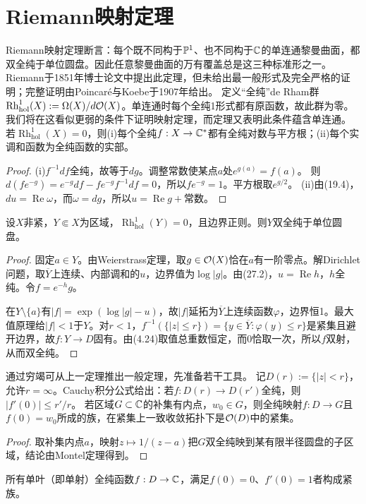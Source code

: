 \section{Riemann映射定理}
Riemann映射定理断言：每个既不同构于$\mathbb P^1$、也不同构于$\mathbb C$的单连通黎曼曲面，都双全纯于单位圆盘。因此任意黎曼曲面的万有覆盖总是这三种标准形之一。Riemann于1851年博士论文中提出此定理，但未给出最一般形式及完全严格的证明；完整证明由Poincaré与Koebe于1907年给出。
定义“全纯”de Rham群$\operatorname{Rh}_{\mathrm{hol}}^1(X):=\Omega(X)/d\mathcal O(X)$。单连通时每个全纯1形式都有原函数，故此群为零。我们将在这看似更弱的条件下证明映射定理，而定理又表明此条件蕴含单连通。
若$\operatorname{Rh}_{\mathrm{hol}}^1(X)=0$，则(i)每个全纯$f:X\to\mathbb C^*$都有全纯对数与平方根；(ii)每个实调和函数为全纯函数的实部。
\begin{proof}
(i)$f^{-1}df$全纯，故等于$dg$。调整常数使某点$a$处$e^{g(a)}=f(a)$。
则$d(fe^{-g})=e^{-g}df-fe^{-g}f^{-1}df=0$，所以$fe^{-g}=1$。平方根取$e^{g/2}$。
(ii)由(19.4)，$du=\operatorname{Re}\omega$，而$\omega=dg$，所以$u=\operatorname{Re}g+\text{常数}$。
\end{proof}
设$X$非紧，$Y\Subset X$为区域，$\operatorname{Rh}_{\mathrm{hol}}^1(Y)=0$，且边界正则。则$Y$双全纯于单位圆盘。
\begin{proof}
固定$a\in Y$。由Weierstrass定理，取$g\in\mathcal O(X)$恰在$a$有一阶零点。解Dirichlet问题，取$\overline Y$上连续、内部调和的$u$，边界值为$\log|g|$。由(27.2)，$u=\operatorname{Re}h$，$h$全纯。令$f=e^{-h}g$。

在$Y\setminus\{a\}$有$|f|=\exp(\log|g|-u)$，故$|f|$延拓为$\overline Y$上连续函数$\varphi$，边界恒1。最大值原理给$|f|<1$于$Y$。对$r<1$，$f^{-1}(\{|z|\le r\})=\{y\in\overline Y:\varphi(y)\le r\}$是紧集且避开边界，故$f:Y\to D$固有。由(4.24)取值总重数恒定，而0恰取一次，所以$f$双射，从而双全纯。
\end{proof}
通过穷竭可从上一定理推出一般定理，先准备若干工具。
记$D(r):=\{|z|<r\}$，允许$r=\infty$。Cauchy积分公式给出：若$f:D(r)\to D(r')$全纯，则$|f'(0)|\le r'/r$。
若区域$G\subset\mathbb C$的补集有内点，$w_0\in G$，则全纯映射$f:D\to G$且$f(0)=w_0$所成的族，在紧集上一致收敛拓扑下是$\mathcal O(D)$中的紧集。
\begin{proof}
取补集内点$a$，映射$z\mapsto1/(z-a)$把$G$双全纯映到某有限半径圆盘的子区域，结论由Montel定理得到。
\end{proof}
所有单叶（即单射）全纯函数$f:D\to\mathbb C$，满足$f(0)=0$、$f'(0)=1$者构成紧族。
